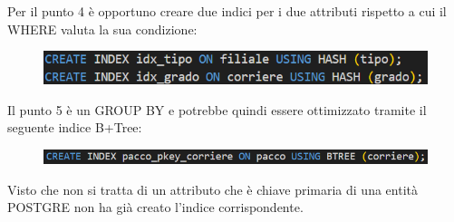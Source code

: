 \noindent Per il punto 4 è opportuno creare due indici per i due attributi rispetto a cui il WHERE valuta la sua condizione:

\begin{figure}[H]
\centering
\includegraphics[width=1 \textwidth]{Resources/INDEX4.png}
\label{ML}
\end{figure}

\noindent Il punto 5 è un GROUP BY e potrebbe quindi essere ottimizzato tramite il seguente indice B+Tree:
 
\begin{figure}[H]
\centering
\includegraphics[width=1 \textwidth]{Resources/INDEX5.png}
\label{ML}
\end{figure}  

\noindent Visto che non si tratta di un attributo che è chiave primaria di una entità POSTGRE non ha già creato l'indice corrispondente. 